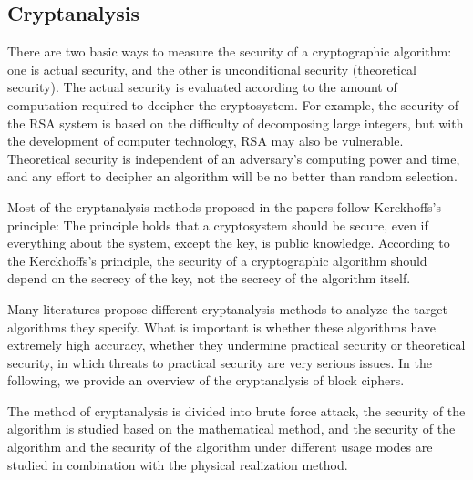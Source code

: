 





\subsection{Cryptanalysis}
There are two basic ways to measure the security of a cryptographic algorithm: one is actual security, and the other is unconditional security (theoretical security). The actual security is evaluated according to the amount of computation required to decipher the cryptosystem. For example, the security of the RSA system is based on the difficulty of decomposing large integers, but with the development of computer technology, RSA may also be vulnerable. Theoretical security is independent of an adversary's computing power and time, and any effort to decipher an algorithm will be no better than random selection. 

Most of the cryptanalysis methods proposed in the papers follow Kerckhoffs's principle: The principle holds that a cryptosystem should be secure, even if everything about the system, except the key, is public knowledge. According to the Kerckhoffs's principle, the security of a cryptographic algorithm should depend on the secrecy of the key, not the secrecy of the algorithm itself.

Many literatures propose different cryptanalysis methods to analyze the target algorithms they specify. What is important is whether these algorithms have extremely high accuracy, whether they undermine practical security or theoretical security, in which threats to practical security are very serious issues. In the following, we provide an overview of the cryptanalysis of block ciphers.

The method of cryptanalysis is divided into brute force attack, the security of the algorithm is studied based on the mathematical method, and the security of the algorithm and the security of the algorithm under different usage modes are studied in combination with the physical realization method. 

